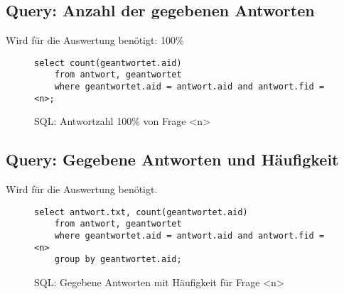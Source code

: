 \subsection{Query: Anzahl der gegebenen Antworten}
Wird für die Auswertung benötigt: 100\%

\begin{figure}[h]
\begin{verbatim}
select count(geantwortet.aid) 
	from antwort, geantwortet 
	where geantwortet.aid = antwort.aid and antwort.fid = <n>;
\end{verbatim}
\caption{SQL: Antwortzahl 100\% von Frage <n>}
\label{sql:qantw100}
\end{figure}

\subsection{Query: Gegebene Antworten und Häufigkeit}
Wird für die Auswertung benötigt.

\begin{figure}[h]
\begin{verbatim}
select antwort.txt, count(geantwortet.aid) 
	from antwort, geantwortet 
	where geantwortet.aid = antwort.aid and antwort.fid = <n> 
	group by geantwortet.aid;
\end{verbatim}
\caption{SQL: Gegebene Antworten mit Häufigkeit für Frage <n>}
\label{sql:qantwnum}
\end{figure}
